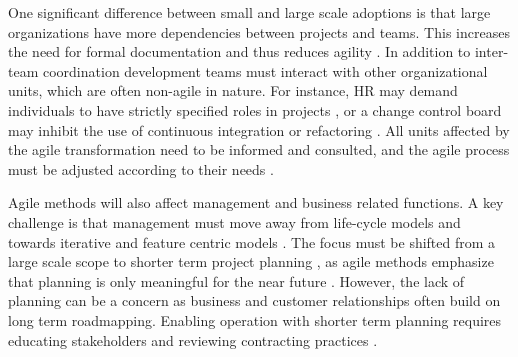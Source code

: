 One significant difference between small and large scale adoptions is that large
organizations have more dependencies between projects and teams. This increases
the need for formal documentation and thus reduces agility \citep{Lindvall2004}.
In addition to inter-team coordination development teams must interact with
other organizational units, which are often non-agile in nature. For instance,
HR may demand individuals to have strictly specified roles in projects
\citep{Boehm2005}, or a change control board may inhibit the use of continuous
integration or refactoring \citep{Lindvall2004}. All units affected by the agile
transformation need to be informed and consulted, and the agile process must be
adjusted according to their needs \citep{Lindvall2004, Cohn2003, Boehm2005}.

Agile methods will also affect management and business related functions. A key
challenge is that management must move away from life-cycle models and towards
iterative and feature centric models \citep{Nerur2005}. The focus must be shifted
from a large scale scope to shorter term project planning \citep{Misra2010}, as
agile methods emphasize that planning is only meaningful for the near future
\citep{Cohn2003}. However, the lack of planning can be a concern as business and
customer relationships often build on long term roadmapping. Enabling operation
with shorter term planning requires educating stakeholders and reviewing
contracting practices \citep{Boehm2005}.




% 

% 


